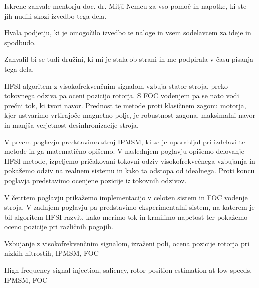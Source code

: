 \documentclass[a4paper,twoside,openright,12pt,slovene]{book}
\date{Ljubljana, \the\year}
\begin{document}
\frontmatter


\maketitle

\zahvala

Iskrene zahvale mentorju doc. dr. Mitji Nemcu za vso pomoč in napotke, ki ste jih nudili skozi izvedbo tega dela. 

Hvala podjetju, ki je omogočilo izvedbo te naloge in vsem sodelavcem za ideje in spodbudo.

Zahvalil bi se tudi družini, ki mi je stala ob strani in me podpirala v času pisanja tega dela.

\povzetek
HFSI algoritem z visokofrekvenčnim signalom vzbuja stator stroja, preko tokovnega odziva pa oceni pozicijo rotorja. S FOC vodenjem pa se nato vodi prečni tok, ki tvori navor. Prednost te metode
proti klasičnem zagonu motorja, kjer ustvarimo vrtirajoče magnetno polje, je robustnost zagona, maksimalni navor in manjša verjetnost desinhronizacije stroja. 

V prvem poglavju predstavimo stroj IPMSM, ki se je uporabljal pri izdelavi te metode in ga matematično opišemo. V naslednjem poglavju opišemo delovanje HFSI metode, izpeljemo pričakovani tokovni odziv
visokofrekvečnega vzbujanja in pokažemo odziv na realnem sistemu in kako ta odstopa od idealnega. Proti koncu poglavja predstavimo ocenjene pozicije iz tokovnih odzivov. 

V četrtem poglavju prikažemo implementacijo v celoten sistem in FOC vodenje stroja. V zadnjem poglavju pa predstavimo eksperimentalni sistem, na katerem je bil algoritem HFSI razvit, kako merimo tok
in krmilimo napetost ter pokažemo oceno pozicije pri različnih pogojih.

\kljucnebesede
Vzbujanje z visokofrekvenčnim signalom, izraženi poli, ocena pozicije rotorja pri nizkih hitrostih, IPMSM, FOC



\abstract


\keywords
High frequency signal injection, saliency, rotor position estimation at low speeds, IPMSM, FOC
\end{document}

